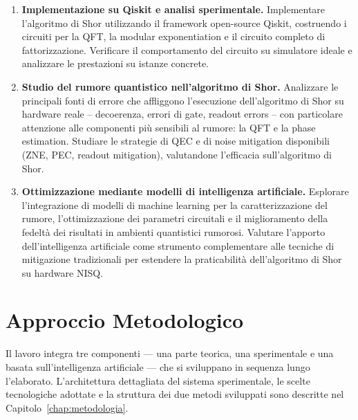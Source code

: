 \begin{onehalfspace}
\begin{enumerate}
    \item \textbf{Implementazione su Qiskit e analisi sperimentale.}
    Implementare l'algoritmo di Shor utilizzando il framework open-source Qiskit, costruendo i circuiti per la QFT, la modular exponentiation e il circuito completo di fattorizzazione. Verificare il comportamento del circuito su simulatore ideale e analizzare le prestazioni su istanze concrete.

    \item \textbf{Studio del rumore quantistico nell'algoritmo di Shor.}
    Analizzare le principali fonti di errore che affliggono l'esecuzione dell'algoritmo di Shor su hardware reale -- decoerenza, errori di gate, readout errors -- con particolare attenzione alle componenti più sensibili al rumore: la QFT e la phase estimation. Studiare le strategie di \ac{QEC} e di noise mitigation disponibili (\ac{ZNE}, \ac{PEC}, readout mitigation), valutandone l'efficacia sull'algoritmo di Shor.

    \item \textbf{Ottimizzazione mediante modelli di intelligenza artificiale.}
    Esplorare l'integrazione di modelli di machine learning per la caratterizzazione del rumore, l'ottimizzazione dei parametri circuitali e il miglioramento della fedeltà dei risultati in ambienti quantistici rumorosi. Valutare l'apporto dell'intelligenza artificiale come strumento complementare alle tecniche di mitigazione tradizionali per estendere la praticabilità dell'algoritmo di Shor su hardware NISQ.

\end{enumerate}

\section{Approccio Metodologico}

Il lavoro integra tre componenti --- una parte teorica, una sperimentale e una basata sull'intelligenza artificiale --- che si sviluppano in sequenza lungo l'elaborato. L'architettura dettagliata del sistema sperimentale, le scelte tecnologiche adottate e la struttura dei due metodi sviluppati sono descritte nel Capitolo~\ref{chap:metodologia}.

\end{onehalfspace}
